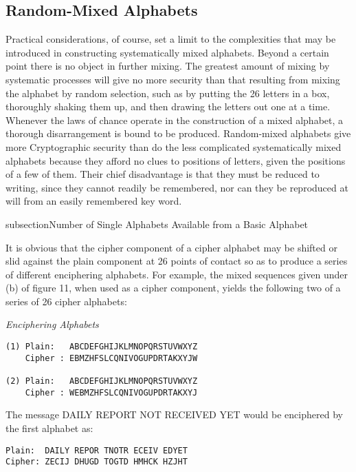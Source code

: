 \subsection{Random-Mixed Alphabets}

Practical considerations, of course, set a limit to the complexities that
may be introduced in constructing systematically mixed alphabets.
Beyond a certain point there is no object in further mixing. The greatest
amount of mixing by systematic processes will give no more security
than that resulting from mixing the alphabet by random selection, such
as by putting the 26 letters in a box, thoroughly shaking them up, and
then drawing the letters out one at a time. Whenever the laws of chance
operate in the construction of a mixed alphabet, a thorough disarrangement is bound to be produced. Random-mixed alphabets give more
Cryptographic security than do the less complicated systematically mixed
alphabets because they afford no clues to positions of letters, given the
positions of a few of them. Their chief disadvantage is that they must be
reduced to writing, since they cannot readily be remembered, nor can
they be reproduced at will from an easily remembered key word.

subsection{Number of Single Alphabets Available from a Basic Alphabet}

It is obvious that the cipher component of a cipher alphabet may be
shifted or slid against the plain component at 26 points of contact so as
to produce a series of different enciphering alphabets. For example, the
mixed sequences given under (b) of ﬁgure 11, when used as a cipher
component, yields the following two of a series of 26 cipher alphabets:

\begin{center}
\textit{Enciphering Alphabets}
\end{center}

\begin{verbatim}
(1) Plain:   ABCDEFGHIJKLMNOPQRSTUVWXYZ
    Cipher : EBMZHFSLCQNIVOGUPDRTAKXYJW

(2) Plain:   ABCDEFGHIJKLMNOPQRSTUVWXYZ
    Cipher : WEBMZHFSLCQNIVOGUPDRTAKXYJ
\end{verbatim}

The message DAILY REPORT NOT RECEIVED YET would be
enciphered by the ﬁrst alphabet as:

\begin{verbatim}
Plain:  DAILY REPOR TNOTR ECEIV EDYET
Cipher: ZECIJ DHUGD TOGTD HMHCK HZJHT
\end{verbatim}

